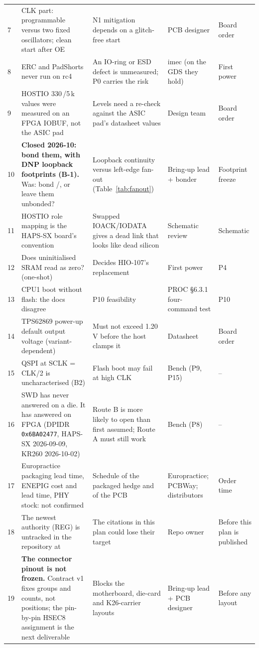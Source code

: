 \documentclass[10pt,a4paper]{article}
\begin{document}
{\begin{longtable}{@{}P{0.45cm}P{5.0cm}P{5.0cm}P{2.6cm}P{2.4cm}@{}}
7 & CLK part: programmable versus two fixed oscillators; clean start after OE & N1 mitigation depends on a glitch-free start & PCB designer & Board order \\
8 & ERC and PadShorts never run on rc4 & An IO-ring or ESD defect is unmeasured; P0 carries the risk & imec (on the GDS they hold) & First power \\
9 & HOSTIO 330\,\textohm{}/5\,k\textohm{} values were measured on an FPGA IOBUF, not the ASIC pad & Levels need a re-check against the ASIC pad's datasheet values & Design team & Board order \\
10 & \textbf{Closed 2026-10: bond them, with DNP loopback footprints (B-1).} Was: bond /, or leave them unbonded? & Loopback continuity versus left-edge fan-out (Table~\ref{tab:fanout}) & Bring-up lead + bonder & Footprint freeze \\
11 & HOSTIO role mapping is the HAPS-SX board's convention & Swapped IOACK/IODATA gives a dead link that looks like dead silicon & Schematic review & Schematic \\
12 & Does uninitialised SRAM read as zero? (one-shot) & Decides HIO-107's replacement & First power & P4 \\
13 & CPU1 boot without flash: the docs disagree & P10 feasibility & PROC \S6.3.1 four-command test & P10 \\
14 & TPS62869 power-up default output voltage (variant-dependent) & Must not exceed 1.20\,V before the host clamps it & Datasheet & Board order \\
15 & QSPI at SCLK = CLK/2 is uncharacterised (B2) & Flash boot may fail at high CLK & Bench (P9, P15) & -- \\
16 & SWD has never answered on a die. It has answered on FPGA (DPIDR \texttt{0x6BA02477}, HAPS-SX 2026-09-09, KR260 2026-10-02) & Route B is more likely to open than first assumed; Route A must still work & Bench (P8) & -- \\
17 & Europractice packaging lead time, ENEPIG cost and lead time, PHY stock: not confirmed & Schedule of the packaged hedge and of the PCB & Europractice; PCBWay; distributors & Order time \\
18 & The newest authority (REG) is untracked in the repository at  & The citations in this plan could lose their target & Repo owner & Before this plan is published \\
19 & \textbf{The connector pinout is not frozen.} Contract v1 fixes groups and counts, not positions; the pin-by-pin HSEC8 assignment is the next deliverable & Blocks the motherboard, die-card and K26-carrier layouts & Bring-up lead + PCB designer & Before any layout \\

\end{longtable}}
\end{document}
